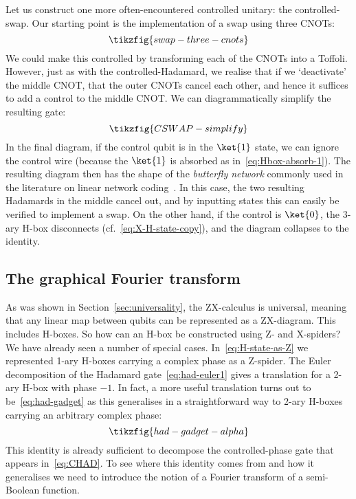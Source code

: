 \documentclass[a4paper,onecolumn,superscriptaddress,11pt,%
				unpublished,%
				allowfontchageintitle,%
				]{quantumarticle}
\begin{document}
Let us construct one more often-encountered controlled unitary: the controlled-swap.
Our starting point is the implementation of a swap using three CNOTs:
\begin{equation}
	\tikzfig{swap-three-cnots}
\end{equation}
We could make this controlled by transforming each of the CNOTs into a Toffoli. However, just as with the controlled-Hadamard, we realise that if we `deactivate' the middle CNOT, that the outer CNOTs cancel each other, and hence it suffices to add a control to the middle CNOT. We can diagrammatically simplify the resulting gate:
\begin{equation}
	\tikzfig{CSWAP-simplify}
\end{equation}
In the final diagram, if the control qubit is in the $\ket{1}$ state, we can ignore the control wire (because the $\ket{1}$ is absorbed as in~\eqref{eq:Hbox-absorb-1}). The resulting diagram then has the shape of the \emph{butterfly network} commonly used in the literature on linear network coding~\cite{debeaudrap_et_al:LIPIcs:2014:4818,Beaudrap2020quantumlinear}. In this case, the two resulting Hadamards in the middle cancel out, and by inputting states this can easily be verified to implement a swap. On the other hand, if the control is $\ket{0}$, the 3-ary H-box disconnects (cf.~\eqref{eq:X-H-state-copy}), and the diagram collapses to the identity.

\subsection{The graphical Fourier transform}\label{sec:fourier}

As was shown in Section~\ref{sec:universality}, the ZX-calculus is universal, meaning that any linear map between qubits can be represented as a ZX-diagram. This includes H-boxes. So how can an H-box be constructed using Z- and X-spiders?
We have already seen a number of special cases. In~\eqref{eq:H-state-as-Z} we represented 1-ary H-boxes carrying a complex phase as a Z-spider. The Euler decomposition of the Hadamard gate~\eqref{eq:had-euler1} gives a translation for a 2-ary H-box with phase $-1$.
In fact, a more useful translation turns out to be~\eqref{eq:had-gadget} as this generalises in a straightforward way to 2-ary H-boxes carrying an arbitrary complex phase:
\begin{equation}\label{eq:had-gadget-alpha}
	\tikzfig{had-gadget-alpha}
\end{equation}
This identity is already sufficient to decompose the controlled-phase gate that appears in~\eqref{eq:CHAD}.
To see where this identity comes from and how it generalises we need to introduce the notion of a Fourier transform of a semi-Boolean function.
\end{document}
